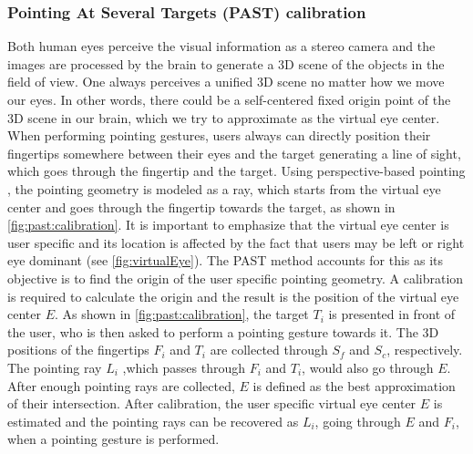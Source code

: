 \subsubsection{Pointing At Several Targets (PAST) calibration} \label{sec:4:PAST}
Both human eyes perceive the visual information as a stereo camera and the images are processed by the brain to generate a 3D scene of the objects in the field of view. One always perceives a unified 3D scene no matter how we move our eyes. In other words, there could be a self-centered fixed origin point of the 3D scene in our brain, which we try to approximate as the virtual eye center. When performing pointing gestures, users always can directly position their fingertips somewhere between their eyes and the target generating a line of sight, which goes through the fingertip and the target. Using perspective-based pointing  \citep{Pierce1997},  the pointing geometry is modeled as a ray, which starts from the virtual eye center and goes through the fingertip towards the target, as shown in \figurename{ \ref{fig:past:calibration}}. It is important to emphasize that the virtual eye center is user specific and its location is affected by the fact that users may be left or right eye dominant (see \figurename{ \ref{fig:virtualEye}}).
The PAST method accounts for this as its objective is to find the origin of the user specific pointing geometry. 
A calibration is required to calculate the origin and the result is the position of the virtual eye center $E$. 
As shown in \figurename{ \ref{fig:past:calibration}}, the target $T_i$ is presented in front of the user, who is then asked to perform a pointing gesture towards it. The 3D positions of the fingertips $F_i$ and $T_i$ are collected through $S_f$ and $S_c$, respectively. The pointing ray $L_i$ ,which passes through $F_i$ and $T_i$, would also go through $E$. After enough pointing rays are collected, $E$ is defined as the best approximation of their intersection. 
After calibration, the user specific virtual eye center $E$ is estimated and the pointing rays can be recovered as $L_{i}$, going through $E$ and  $F_i$, when a pointing gesture is performed.


